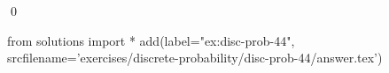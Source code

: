 
\begin{ex} 
  \label{ex:disc-prob-44}
  
  \qed
\end{ex} 
\begin{python0}
from solutions import *
add(label="ex:disc-prob-44",
    srcfilename='exercises/discrete-probability/disc-prob-44/answer.tex') 
\end{python0}
